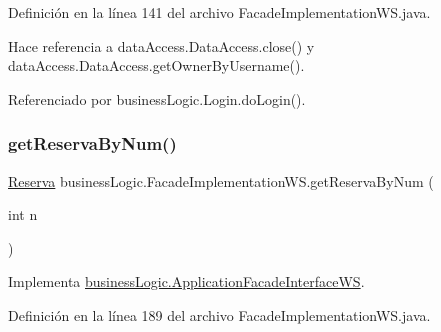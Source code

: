 Definición en la línea 141 del archivo Facade\+Implementation\+W\+S.\+java.


\begin{DoxyCode}{0}

\end{DoxyCode}


Hace referencia a data\+Access.\+Data\+Access.\+close() y data\+Access.\+Data\+Access.\+get\+Owner\+By\+Username().



Referenciado por business\+Logic.\+Login.\+do\+Login().

\mbox{\label{classbusiness_logic_1_1_facade_implementation_w_s_a7b8deff7fb54e2ea7fa884fc13870d6d}} 
\subsubsection{\texorpdfstring{getReservaByNum()}{getReservaByNum()}}
{\footnotesize\ttfamily \mbox{\hyperlink{classdomain_1_1_reserva}{Reserva}} business\+Logic.\+Facade\+Implementation\+W\+S.\+get\+Reserva\+By\+Num (\begin{DoxyParamCaption}\item[{int}]{n }\end{DoxyParamCaption})}



Implementa \mbox{\hyperlink{interfacebusiness_logic_1_1_application_facade_interface_w_s_a1ee7d830657be2563a277591c150f273}{business\+Logic.\+Application\+Facade\+Interface\+WS}}.



Definición en la línea 189 del archivo Facade\+Implementation\+W\+S.\+java.


\begin{DoxyCode}{0}

\end{DoxyCode}


